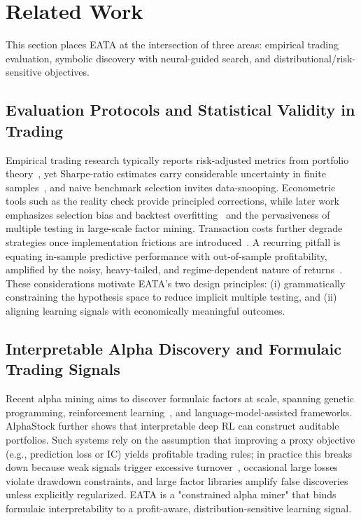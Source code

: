 \section{Related Work}
\label{sec:related}

This section places EATA at the intersection of three areas: empirical trading evaluation, symbolic discovery with neural-guided search, and distributional/risk-sensitive objectives.

\subsection{Evaluation Protocols and Statistical Validity in Trading}

Empirical trading research typically reports risk-adjusted metrics from portfolio theory~\cite{markowitz1952portfolio,sharpe1966mutual}, yet Sharpe-ratio estimates carry considerable uncertainty in finite samples~\cite{lo2002sharpe_stats}, and naive benchmark selection invites data-snooping. Econometric tools such as the reality check provide principled corrections, while later work emphasizes selection bias and backtest overfitting~\cite{bailey2014deflated_sharpe} and the pervasiveness of multiple testing in large-scale factor mining. Transaction costs further degrade strategies once implementation frictions are introduced~\cite{keim1997transaction_costs}. A recurring pitfall is equating in-sample predictive performance with out-of-sample profitability, amplified by the noisy, heavy-tailed, and regime-dependent nature of returns~\cite{cont2001empirical}. These considerations motivate EATA's two design principles: (i) grammatically constraining the hypothesis space to reduce implicit multiple testing, and (ii) aligning learning signals with economically meaningful outcomes.

\subsection{Interpretable Alpha Discovery and Formulaic Trading Signals}

Recent alpha mining aims to discover formulaic factors at scale, spanning genetic programming, reinforcement learning~\cite{yu2023alphagen}, and language-model-assisted frameworks. AlphaStock further shows that interpretable deep RL can construct auditable portfolios. Such systems rely on the assumption that improving a proxy objective (e.g., prediction loss or IC) yields profitable trading rules; in practice this breaks down because weak signals trigger excessive turnover~\cite{keim1997transaction_costs}, occasional large losses violate drawdown constraints, and large factor libraries amplify false discoveries unless explicitly regularized. EATA is a "constrained alpha miner" that binds formulaic interpretability to a profit-aware, distribution-sensitive learning signal.

